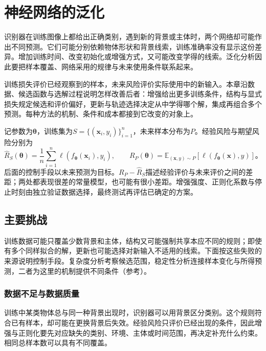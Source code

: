 \chapter{神经网络的泛化}
\label{chap:neural-network-generalization}

识别器在训练图像上都给出正确类别，遇到新的背景或主体时，两个网络却可能作出不同预测。它们可能分别依赖物体形状和背景线索，训练准确率没有显示这份差异。增加训练时间、改变初始化或增强方式，又可能改变学得的线索。泛化分析因此要把样本覆盖、网络采用的规律与未来使用条件联系起来。

训练损失评价已经观察到的样本，未来风险评价实际使用中的新输入。本章沿数据、候选函数与选解过程说明怎样改善后者：增强给出更多训练条件，结构与显式损失规定候选和评价偏好，更新与轨迹选择决定从中学得哪个解，集成再组合多个预测。每种方法的机制、条件和成本都接到它改变的对象上。

记参数为$\bm\theta$，训练集为$S=\{(\bm x_i,y_i)\}_{i=1}^n$，未来样本分布为$P$。经验风险与期望风险分别为
\begin{equation}
  \hat R_S(\bm\theta)=\frac1n\sum_{i=1}^n
    \ell(f_{\bm\theta}(\bm x_i),y_i),\qquad
  R_P(\bm\theta)=\mathbb E_{(\bm x,y)\sim P}
    [\ell(f_{\bm\theta}(\bm x),y)]\text{。}
  \label{eq:generalization-risks}
\end{equation}
后面的控制手段以未来预测为目标。$R_P-\hat R_S$描述经验评价与未来评价之间的差距；两处都表现很差的常量模型，也可能有很小差距。增强强度、正则化系数与停止时刻由独立验证数据选择，最终测试再评估已确定的方案。

\section{主要挑战}
\label{sec:generalization-challenges}

训练数据可能只覆盖少数背景和主体，结构又可能强制共享本应不同的规则；即使有多个同样拟合的解，更新也可能选择对新输入不适用的线索。下面按这些失败的来源说明控制手段。复杂度分析考察候选范围，稳定性分析连接样本变化与所得预测，二者为这里的机制提供不同条件（参考）。

\subsection{数据不足与数据质量}
\label{sec:generalization-data-quality}

训练中某类物体总与同一种背景出现时，识别器可以用背景区分类别。这个规则符合已有样本，却可能在更换背景后失效。经验风险只评价已经出现的条件，因此增强与正则化要先对应缺失的类别、环境、主体或时间范围，再决定补充什么约束。相同总样本数可以具有不同覆盖。

